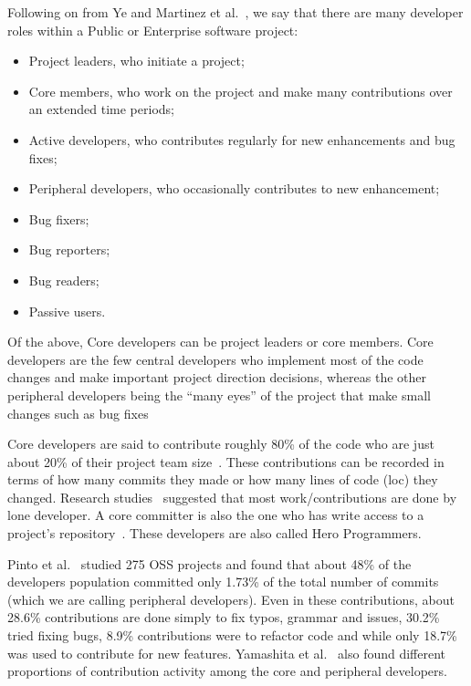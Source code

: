 \documentclass[sigconf]{acmart}
\newcommand{\bi}{\begin{itemize}[leftmargin=0.4cm]}
\newcommand{\ei}{\end{itemize}}
\theoremstyle{break}
\begin{document}
Following on from Ye and Martinez et al.~\cite{ye2003toward,martinez2014current}, we say that
there  are many developer roles within a Public or Enterprise software project:
\bi
\item
 Project leaders,  who initiate a project;
 \item
 Core members, who work on the project and make many contributions over an extended
 time periods;
 \item
 Active developers, who contributes regularly for new enhancements and bug fixes;
 \item
 Peripheral developers, who occasionally contributes to new enhancement;
 \item
 Bug fixers;
 \item
 Bug reporters;
 \item
 Bug readers;
 \item
 Passive users.
 \ei
Of the above,  Core developers can be project leaders or core members. 
Core developers are the few central developers who implement most of the code
changes and make important project direction decisions, whereas  the other peripheral developers being the ``many eyes'' of the project that make small changes such as bug fixes~\cite{mockus2002two,tsay2014influence}

Core developers are said to contribute roughly 80\% of the code
who are just about 20\% of their project team size~\cite{goeminne2011evidence,torres2011analysis,robles2009evolution,yamashita2015revisiting}. These contributions can be recorded in terms of how many commits they made or how many lines of code (loc) they changed. Research studies~\cite{krishnamurthy2002cave, peterson2013github}  suggested that most work/contributions are done by lone developer. A core committer is also the one who has write access to a
project's repository~\cite{padhye2014study}. These developers are also called  Hero Programmers.

Pinto et al.~\cite{pinto2016more} studied 275 OSS projects and found that about 48\% of the developers population committed only 1.73\% of the total number of commits (which we are calling peripheral developers). Even in these contributions, about 28.6\% contributions are done simply to fix typos, grammar and issues, 30.2\% tried fixing bugs, 8.9\%  contributions were to refactor code and while only 18.7\% was used to contribute for new features. Yamashita et al.~\cite{yamashita2015revisiting} also found different proportions of contribution activity among the core and peripheral developers.
\end{document}
